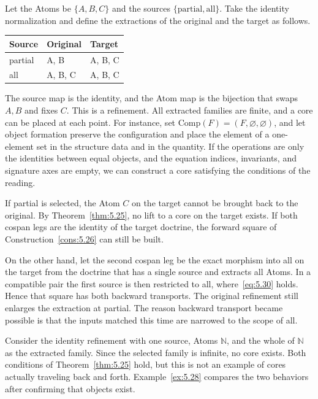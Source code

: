 \begin{example}\label{ex:5.28}

Let the Atoms be $\{A,B,C\}$ and the sources $\{\mathrm{partial},\mathrm{all}\}$. Take the
identity normalization and define the extractions of the original and the target as
follows.

\begin{xltabular}{\linewidth}{@{}LLL@{}}
\toprule
Source & Original & Target \\
\midrule
\endhead
partial & A, B & A, B, C \\
\addlinespace[3pt]
all & A, B, C & A, B, C \\
\bottomrule
\end{xltabular}

The source map is the identity, and the Atom map is the bijection that swaps $A,B$ and
fixes $C$. This is a refinement. All extracted families are finite, and a core can be
placed at each point. For instance, set $\mathrm{Comp}(F)=(F,\varnothing,\varnothing)$, and
let object formation preserve the configuration and place the element of a one-element set
in the structure data and in the quantity. If the operations are only the identities
between equal objects, and the equation indices, invariants, and signature axes are empty,
we can construct a core satisfying the conditions of the reading.

If partial is selected, the Atom $C$ on the target cannot be brought back to the
original. By Theorem~\ref{thm:5.25}, no lift to a core on the target exists. If both cospan
legs are the identity of the target doctrine, the forward square of
Construction~\ref{cons:5.26} can still be built.

On the other hand, let the second cospan leg be the exact morphism into all on the target
from the doctrine that has a single source and extracts all Atoms. In a compatible pair
the first source is then restricted to all, where~\eqref{eq:5.30} holds. Hence that square
has both backward transports. The original refinement still enlarges the extraction at
partial. The reason backward transport became possible is that the inputs matched this
time are narrowed to the scope of all.

\end{example}

\begin{example}\label{ex:5.29}

Consider the identity refinement with one source, Atoms $\mathbb{N}$, and the whole of
$\mathbb{N}$ as the extracted family. Since the selected family is infinite, no core
exists. Both conditions of Theorem~\ref{thm:5.25} hold, but this is not an example of cores
actually traveling back and forth. Example~\ref{ex:5.28} compares the two behaviors after
confirming that objects exist.

\end{example}

